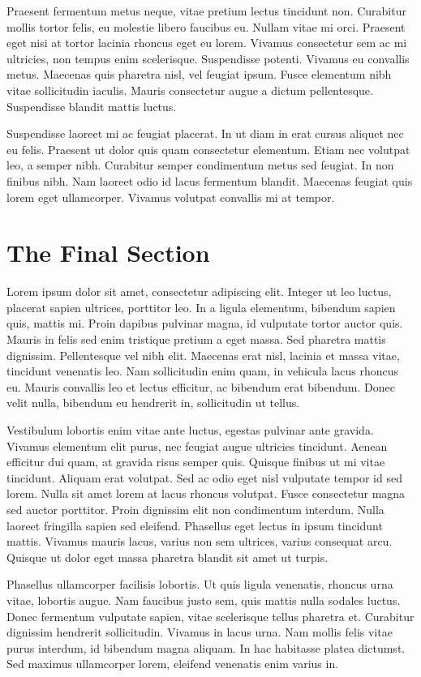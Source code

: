 Praesent fermentum metus neque, vitae pretium lectus tincidunt non. Curabitur mollis tortor felis, eu molestie libero faucibus eu. Nullam vitae mi orci. Praesent eget nisi at tortor lacinia rhoncus eget eu lorem. Vivamus consectetur sem ac mi ultricies, non tempus enim scelerisque. Suspendisse potenti. Vivamus eu convallis metus. Maecenas quis pharetra nisl, vel feugiat ipsum. Fusce elementum nibh vitae sollicitudin iaculis. Mauris consectetur augue a dictum pellentesque. Suspendisse blandit mattis luctus.

Suspendisse laoreet mi ac feugiat placerat. In ut diam in erat cursus aliquet nec eu felis. Praesent ut dolor quis quam consectetur elementum. Etiam nec volutpat leo, a semper nibh. Curabitur semper condimentum metus sed feugiat. In non finibus nibh. Nam laoreet odio id lacus fermentum blandit. Maecenas feugiat quis lorem eget ullamcorper. Vivamus volutpat convallis mi at tempor.

\section{The Final Section}
Lorem ipsum dolor sit amet, consectetur adipiscing elit. Integer ut leo luctus, placerat sapien ultrices, porttitor leo. In a ligula elementum, bibendum sapien quis, mattis mi. Proin dapibus pulvinar magna, id vulputate tortor auctor quis. Mauris in felis sed enim tristique pretium a eget massa. Sed pharetra mattis dignissim. Pellentesque vel nibh elit. Maecenas erat nisl, lacinia et massa vitae, tincidunt venenatis leo. Nam sollicitudin enim quam, in vehicula lacus rhoncus eu. Mauris convallis leo et lectus efficitur, ac bibendum erat bibendum. Donec velit nulla, bibendum eu hendrerit in, sollicitudin ut tellus.

Vestibulum lobortis enim vitae ante luctus, egestas pulvinar ante gravida. Vivamus elementum elit purus, nec feugiat augue ultricies tincidunt. Aenean efficitur dui quam, at gravida risus semper quis. Quisque finibus ut mi vitae tincidunt. Aliquam erat volutpat. Sed ac odio eget nisl vulputate tempor id sed lorem. Nulla sit amet lorem at lacus rhoncus volutpat. Fusce consectetur magna sed auctor porttitor. Proin dignissim elit non condimentum interdum. Nulla laoreet fringilla sapien sed eleifend. Phasellus eget lectus in ipsum tincidunt mattis. Vivamus mauris lacus, varius non sem ultrices, varius consequat arcu. Quisque ut dolor eget massa pharetra blandit sit amet ut turpis.

Phasellus ullamcorper facilisis lobortis. Ut quis ligula venenatis, rhoncus urna vitae, lobortis augue. Nam faucibus justo sem, quis mattis nulla sodales luctus. Donec fermentum vulputate sapien, vitae scelerisque tellus pharetra et. Curabitur dignissim hendrerit sollicitudin. Vivamus in lacus urna. Nam mollis felis vitae purus interdum, id bibendum magna aliquam. In hac habitasse platea dictumst. Sed maximus ullamcorper lorem, eleifend venenatis enim varius in.